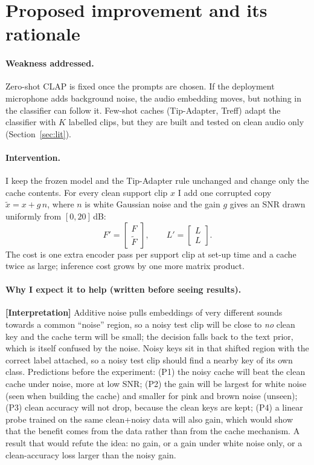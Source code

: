 \section{Proposed improvement and its rationale}
\label{sec:improve}

\paragraph{Weakness addressed.}
Zero-shot CLAP is fixed once the prompts are chosen. If the deployment microphone adds background noise, the audio embedding moves,
but nothing in the classifier can follow it. Few-shot caches (Tip-Adapter, Treff) adapt the classifier with $K$ labelled clips,
but they are built and tested on clean audio only (Section~\ref{sec:lit}).

\paragraph{Intervention.}
I keep the frozen model and the Tip-Adapter rule unchanged and change only the cache contents.
For every clean support clip $x$ I add one corrupted copy $\tilde x = x + g\,n$, where $n$ is white Gaussian noise and the gain $g$ gives an SNR drawn uniformly from $[0, 20]$\,dB:
\[
  F' = \begin{bmatrix} F \\ \tilde F \end{bmatrix},\qquad L' = \begin{bmatrix} L \\ L \end{bmatrix}.
\]
The cost is one extra encoder pass per support clip at set-up time and a cache twice as large; inference cost grows by one more matrix product.

\paragraph{Why I expect it to help (written before seeing results).}
\textbf{[Interpretation]} Additive noise pulls embeddings of very different sounds towards a common ``noise'' region, so a noisy test clip will be close to
\emph{no} clean key and the cache term will be small; the decision falls back to the text prior, which is itself confused by the noise.
Noisy keys sit in that shifted region with the correct label attached, so a noisy test clip should find a nearby key of its own class.
Predictions before the experiment:
(P1) the noisy cache will beat the clean cache under noise, more at low SNR;
(P2) the gain will be largest for white noise (seen when building the cache) and smaller for pink and brown noise (unseen);
(P3) clean accuracy will not drop, because the clean keys are kept;
(P4) a linear probe trained on the same clean+noisy data will also gain, which would show that the benefit comes from the data rather than from the cache mechanism.
A result that would refute the idea: no gain, or a gain under white noise only, or a clean-accuracy loss larger than the noisy gain.

